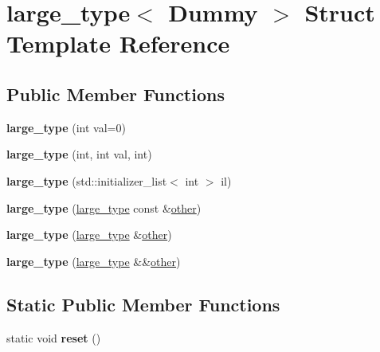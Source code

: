 \hypertarget{structlarge__type}{}\section{large\+\_\+type$<$ Dummy $>$ Struct Template Reference}
\label{structlarge__type}
\subsection*{Public Member Functions}
\begin{DoxyCompactItemize}
\item 
\mbox{\label{structlarge__type_aab82564b624954d88845a75268de28cb}} 
{\bfseries large\+\_\+type} (int val=0)
\item 
\mbox{\label{structlarge__type_abeef3bebb71494cb86e569f9d02a0e98}} 
{\bfseries large\+\_\+type} (int, int val, int)
\item 
\mbox{\label{structlarge__type_acdaae773a5963e5fc96d3d7d85bb8549}} 
{\bfseries large\+\_\+type} (std\+::initializer\+\_\+list$<$ int $>$ il)
\item 
\mbox{\label{structlarge__type_a81b2af040a9e1f67e63bfcb0cefeb186}} 
{\bfseries large\+\_\+type} (\mbox{\hyperlink{structlarge__type}{large\+\_\+type}} const \&\mbox{\hyperlink{structother}{other}})
\item 
\mbox{\label{structlarge__type_ae3b183339f8c25971d848ab34804480f}} 
{\bfseries large\+\_\+type} (\mbox{\hyperlink{structlarge__type}{large\+\_\+type}} \&\mbox{\hyperlink{structother}{other}})
\item 
\mbox{\label{structlarge__type_aac3fcbf97644e3c4646b1ca596e56b2e}} 
{\bfseries large\+\_\+type} (\mbox{\hyperlink{structlarge__type}{large\+\_\+type}} \&\&\mbox{\hyperlink{structother}{other}})
\end{DoxyCompactItemize}
\subsection*{Static Public Member Functions}
\begin{DoxyCompactItemize}
\item 
\mbox{\label{structlarge__type_ac72f4578bf40d3ec3b7fbacf752af39d}} 
static void {\bfseries reset} ()
\end{DoxyCompactItemize}
